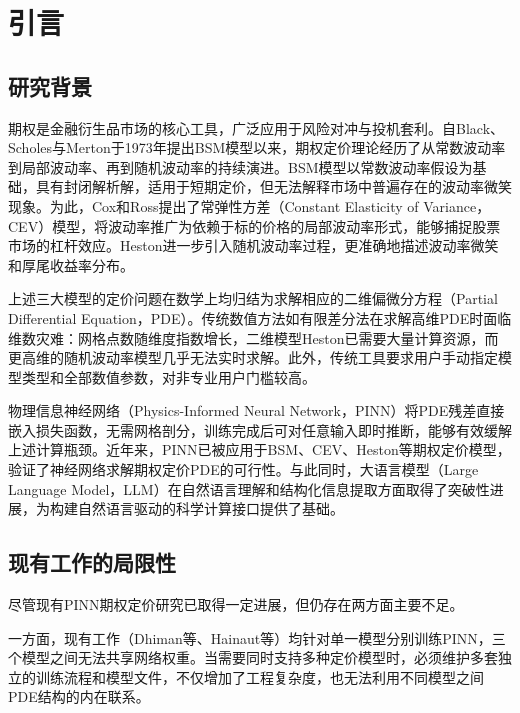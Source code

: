 \chapter{引言}\label{chap:intro}

\section{研究背景}\label{sec:background}

期权是金融衍生品市场的核心工具，广泛应用于风险对冲与投机套利。自Black、Scholes与Merton于1973年提出BSM模型\cite{black1973pricing,merton1973theory}以来，期权定价理论经历了从常数波动率到局部波动率、再到随机波动率的持续演进。BSM模型以常数波动率假设为基础，具有封闭解析解，适用于短期定价，但无法解释市场中普遍存在的波动率微笑现象。为此，Cox和Ross\cite{cox1976valuation}提出了常弹性方差（Constant Elasticity of Variance，CEV）模型，将波动率推广为依赖于标的价格的局部波动率形式，能够捕捉股票市场的杠杆效应。Heston\cite{heston1993closed}进一步引入随机波动率过程，更准确地描述波动率微笑和厚尾收益率分布。

上述三大模型的定价问题在数学上均归结为求解相应的二维偏微分方程（Partial Differential Equation，PDE）。传统数值方法如有限差分法在求解高维PDE时面临维数灾难：网格点数随维度指数增长，二维模型Heston已需要大量计算资源，而更高维的随机波动率模型几乎无法实时求解。此外，传统工具要求用户手动指定模型类型和全部数值参数，对非专业用户门槛较高。

物理信息神经网络（Physics-Informed Neural Network，PINN）\cite{raissi2019physics}将PDE残差直接嵌入损失函数，无需网格剖分，训练完成后可对任意输入即时推断，能够有效缓解上述计算瓶颈。近年来，PINN已被应用于BSM\cite{dhiman2023pinn}、CEV\cite{zamxaka2023cev}、Heston\cite{hainaut2024heston,guo2024icpinn}等期权定价模型，验证了神经网络求解期权定价PDE的可行性。与此同时，大语言模型（Large Language Model，LLM）在自然语言理解和结构化信息提取方面取得了突破性进展\cite{liu2025pdeagent}，为构建自然语言驱动的科学计算接口提供了基础。

\section{现有工作的局限性}\label{sec:motivation}

尽管现有PINN期权定价研究已取得一定进展，但仍存在两方面主要不足。

一方面，现有工作（Dhiman等\cite{dhiman2023pinn}、Hainaut等\cite{hainaut2024heston}）均针对单一模型分别训练PINN，三个模型之间无法共享网络权重。当需要同时支持多种定价模型时，必须维护多套独立的训练流程和模型文件，不仅增加了工程复杂度，也无法利用不同模型之间PDE结构的内在联系。

